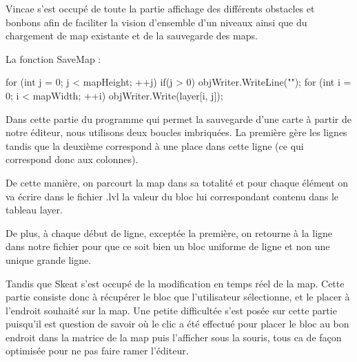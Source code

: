 \documentclass [11pt]{report}
\begin{document}
			 Vincae s'est occupé de toute la partie affichage des différents obstacles et bonbons afin de faciliter la vision d'ensemble d'un niveaux ainsi que du chargement de map existante et de la sauvegarde des maps.\\
			 
			 
			 
	\newpage
		
	\noindent La fonction SaveMap : 
			 
	 \begin{mylisting}
	
      for (int j = 0; j < mapHeight; ++j)
      {
        if(j > 0)
           objWriter.WriteLine("");
        for (int i = 0; i < mapWidth; ++i)
        {
           objWriter.Write(layer[i, j]);
        }
      }
      
	\end{mylisting}
		
		
		\vspace{10mm}
		
		
		
		Dans cette partie du programme qui permet la sauvegarde d'une carte à partir de  notre éditeur, nous utilisons deux boucles imbriquées. La première gère les lignes tandis que la deuxième correspond à une place dans cette ligne (ce qui correspond donc aux colonnes).
		
		De cette manière, on parcourt la map dans sa totalité et pour chaque élément on va écrire dans le fichier .lvl la valeur du bloc lui correspondant contenu dans le tableau layer. 
		
		De plus, à chaque début de ligne, exceptée la première, on retourne à la ligne dans notre fichier pour que ce soit bien un bloc uniforme de ligne et non une unique grande ligne.\\
		
		\vspace{10mm}
		
		
		Tandis que Skeat s'est occupé de la modification en temps réel de la map. Cette partie consiste donc à récupérer le bloc que l'utilisateur sélectionne, et le placer à l'endroit souhaité sur la map. Une petite difficultée s'est posée sur cette partie puisqu'il est question de savoir où le clic a été effectué pour placer le bloc au bon endroit dans la matrice de la map puis l'afficher sous la souris, tous ca de façon optimisée pour ne pas faire ramer l'éditeur.\\
			 
			
	
	
	\newpage
	
\end{document}
